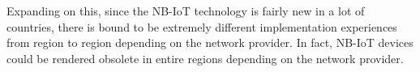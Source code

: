 Expanding on this, since the NB-IoT technology is fairly new in a lot of countries, there is bound to be extremely different implementation experiences from region to region depending on the network provider. In fact, NB-IoT devices could be rendered obsolete in entire regions depending on the network provider.
